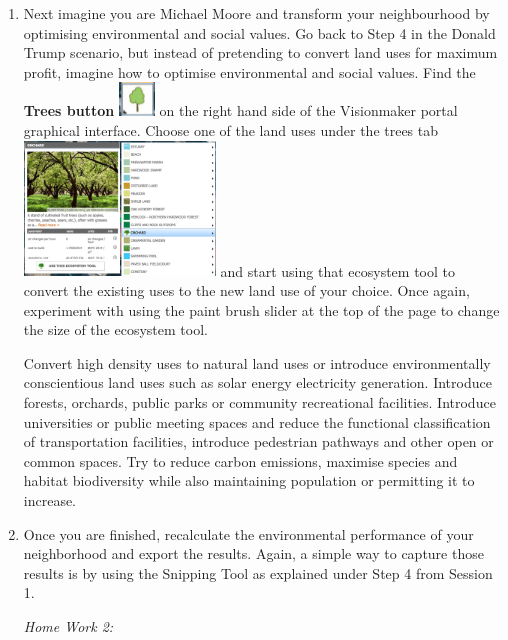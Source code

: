 \documentclass{article}
\begin{document}
\begin{enumerate}[leftmargin=15mm]

\item Next imagine you are Michael Moore and transform your neighbourhood by optimising environmental and social values.  Go back to Step 4 in the Donald Trump scenario, but instead of pretending to convert land uses for maximum profit, imagine how to optimise environmental and social values.  Find the \textbf{Trees button} \includegraphics[width=0.075\textwidth]{trees.png} on the right hand side of the Visionmaker portal graphical interface.  Choose one of the land uses under the trees tab \includegraphics[width=0.4\textwidth]{trees2.png} and start using that ecosystem tool to convert the existing uses to the new land use of your choice. Once again, experiment with using the paint brush slider at the top of the page to change the size of the ecosystem tool.

Convert high density uses to natural land uses or introduce environmentally conscientious land uses such as solar energy electricity generation.  Introduce forests, orchards, public parks or community recreational facilities.  Introduce universities or public meeting spaces and reduce the functional classification of transportation facilities, introduce pedestrian pathways and other open or common spaces.  Try to reduce carbon emissions, maximise species and habitat biodiversity while also maintaining population or permitting it to increase.  

\item Once you are finished, recalculate the environmental performance of your neighborhood and export the results.  Again, a simple way to capture those results is by using the Snipping Tool as explained under Step 4 from Session 1. 


\vspace{4mm}
\setlength{\leftskip}{0cm}
\textit{Home Work 2:}


\end{enumerate}
\end{document}
